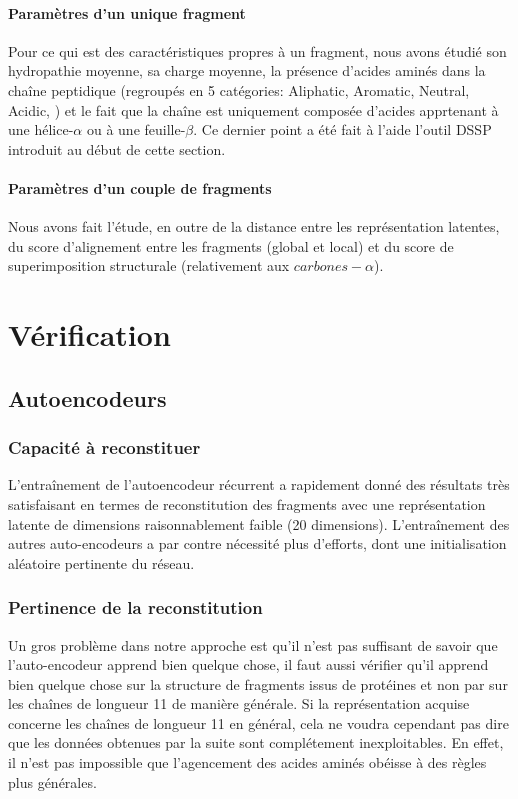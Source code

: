 \documentclass[a4paper, 11pt, onecolumn]{article}
\begin{document}
\paragraph{Paramètres d'un unique fragment}

Pour ce qui est des caractéristiques propres à un fragment, nous avons étudié
son hydropathie moyenne, sa charge moyenne, la présence d'acides aminés dans la
chaîne peptidique (regroupés en 5 catégories: Aliphatic, Aromatic, Neutral,
Acidic, ) et le fait que la chaîne est uniquement composée d'acides apprtenant à
une hélice-$\alpha$ ou à une feuille-$\beta$. Ce dernier point a été fait à
l'aide l'outil DSSP introduit au début de cette section.

\paragraph{Paramètres d'un couple de fragments}

Nous avons fait l'étude, en outre de la distance entre les représentation
latentes, du score d'alignement entre les fragments (global et local) et du score de superimposition structurale (relativement
aux $carbones-\alpha$).

\section{Vérification}

\subsection{Autoencodeurs}

\subsubsection{Capacité à reconstituer}

L'entraînement de l'autoencodeur récurrent a rapidement donné des résultats très
satisfaisant en termes de reconstitution des fragments  avec une représentation
latente de dimensions raisonnablement faible (20 dimensions). L'entraînement des
autres auto-encodeurs a par contre nécessité plus d'efforts, dont une
initialisation aléatoire pertinente du réseau.

\subsubsection{Pertinence de la reconstitution}

Un gros problème dans notre approche est qu'il n'est pas suffisant de savoir que
l'auto-encodeur apprend bien quelque chose, il faut aussi vérifier qu'il apprend
bien quelque chose sur la structure de fragments issus de protéines et non par
sur les chaînes de longueur 11 de manière générale. Si la représentation acquise
concerne les chaînes de longueur 11 en général, cela ne voudra cependant pas dire que les
données obtenues par la suite sont complétement inexploitables. En effet, il
n'est pas impossible que l'agencement des acides aminés obéisse à des règles
plus générales.
\end{document}
